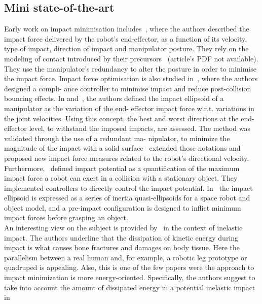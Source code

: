 \documentclass[letterpaper, 10 pt, conference]{ieeeconf}  %
\begin{document}
\subsection{Mini state-of-the-art}
Early work on impact minimisation includes~\cite{impact_dyn::walker1990use}, where
the authors described the impact force delivered by the
robot’s end-effector, as a function of its velocity, type of
impact, direction of impact and manipulator posture. They rely on the modeling of contact introduced by their precursors~\cite{impact_dyn::zheng1985mathematical} (article's PDF not available). They
use the manipulator’s redundancy to alter the posture in order
to minimise the impact force. Impact force optimisation is
also studied in~\cite{impact_dyn::lin1995impact}, where the authors designed a compli-
ance controller to minimise impact and reduce post-collision
bouncing effects.
In \cite{impact_dyn::walker1994impact} and~\cite{impact_dyn::barcio1994impact}, the authors defined the
impact ellipsoid of a manipulator as the variation of the end-
effector impact force w.r.t. variations in the joint velocities. Using this
concept, the best and worst directions at the end-effector
level, to withstand the imposed impacts, are assessed. The
method was validated through the use of a redundant ma-
nipulator, to minimize the magnitude of the impact with a
solid surface
\cite{impact_dyn::kim2000normalized}~extended those notations and proposed new
impact force measures related to the robot’s directional
velocity. Furthermore,~\cite{impact_dyn::heinzmann2003quantitative} defined impact
potential as a quantification of the maximum impact force
a robot can exert in a collision with a stationary object.
They implemented controllers to directly control the impact
potential. In~\cite{impact_dyn::hu2017pre} the impact ellipsoid is expressed as a
series of inertia quasi-ellipsoids for a space robot and object
model, and a pre-impact configuration is designed to inflict
minimum impact forces before grasping an object.\\
An interesting view on the subject is provided by~\cite{impact_dyn::rossi2015pre} in the context of inelastic impact. The authors underline that the dissipation of kinetic energy during impact is what causes bone fractures and damages on body tissue. Here the parallelism between a real human and, for example, a robotic leg prototype or quadruped is appealing. Also, this is one of the few papers were the approach to impact minimization is more energy-oriented. Specifically, the authors suggest to take into account the
amount of dissipated energy in a potential inelastic impact in
\end{document}
